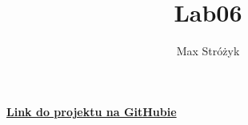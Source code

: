 \documentclass[a4paper, 11pt]{article}
\title{Lab06}
\author{Max Stróżyk}
\begin{document}
\maketitle
\tableofcontents
\begin{center}
    \href{https://github.com/maxi7524/numerical_methods_lab06}{\textbf{Link do projektu na GitHubie}}
\end{center}


\newpage


\newpage


%  
% 


% 
\end{document}
